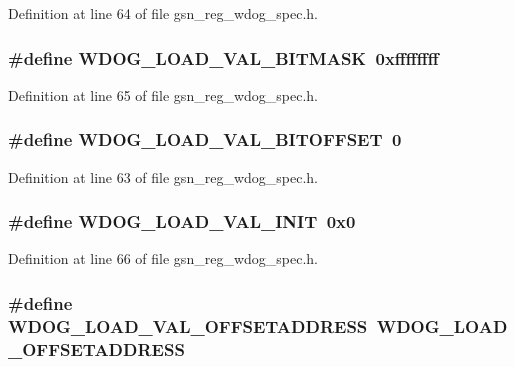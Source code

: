 Definition at line 64 of file gsn\_\-reg\_\-wdog\_\-spec.h.

\hypertarget{a00577_a2554e5e63a07a3150c07ec7588eaeb8c}{
\subsubsection[{WDOG\_\-LOAD\_\-VAL\_\-BITMASK}]{\setlength{\rightskip}{0pt plus 5cm}\#define WDOG\_\-LOAD\_\-VAL\_\-BITMASK~0xffffffff}}
\label{a00577_a2554e5e63a07a3150c07ec7588eaeb8c}


Definition at line 65 of file gsn\_\-reg\_\-wdog\_\-spec.h.

\hypertarget{a00577_a277867f853d137e306be1b2a9af141b3}{
\subsubsection[{WDOG\_\-LOAD\_\-VAL\_\-BITOFFSET}]{\setlength{\rightskip}{0pt plus 5cm}\#define WDOG\_\-LOAD\_\-VAL\_\-BITOFFSET~0}}
\label{a00577_a277867f853d137e306be1b2a9af141b3}


Definition at line 63 of file gsn\_\-reg\_\-wdog\_\-spec.h.

\hypertarget{a00577_a20c4543485afcc24617b3e9f72aef058}{
\subsubsection[{WDOG\_\-LOAD\_\-VAL\_\-INIT}]{\setlength{\rightskip}{0pt plus 5cm}\#define WDOG\_\-LOAD\_\-VAL\_\-INIT~0x0}}
\label{a00577_a20c4543485afcc24617b3e9f72aef058}


Definition at line 66 of file gsn\_\-reg\_\-wdog\_\-spec.h.

\hypertarget{a00577_acbf2a1d88a2cf2a8089cf69d54d09dae}{
\subsubsection[{WDOG\_\-LOAD\_\-VAL\_\-OFFSETADDRESS}]{\setlength{\rightskip}{0pt plus 5cm}\#define WDOG\_\-LOAD\_\-VAL\_\-OFFSETADDRESS~WDOG\_\-LOAD\_\-OFFSETADDRESS}}
\label{a00577_acbf2a1d88a2cf2a8089cf69d54d09dae}


